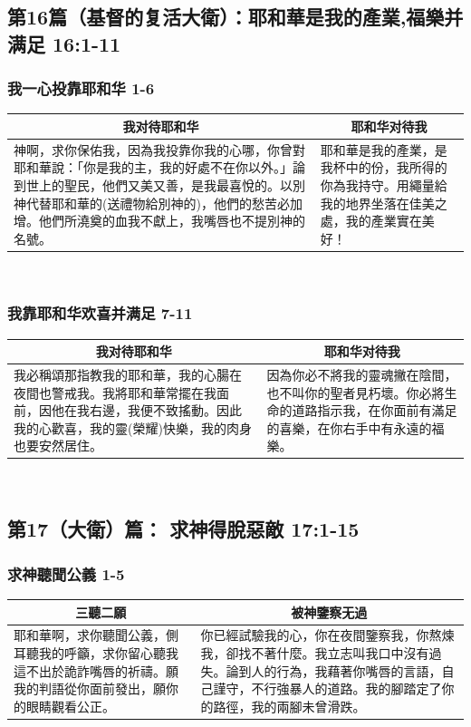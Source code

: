 \subsection{第16篇（基督的复活大衛）：耶和華是我的產業,福樂并满足  16:1-11}
\subsubsection{我一心投靠耶和华 1-6}
\begin{table}[H]
\centering
\begin{tabular}{p{}|p{}}\hline\hline
\multicolumn{1}{c|}{我对待耶和华}&\multicolumn{1}{c}{耶和华对待我}\\\hline
神啊，求你保佑我，因為我投靠你我的心哪，你曾對耶和華說：「你是我的主，我的好處不在你以外。」論到世上的聖民，他們又美又善，是我最喜悅的。以別神代替耶和華的(送禮物給別神的)，他們的愁苦必加增。他們所澆奠的血我不獻上，我嘴唇也不提別神的名號。
&耶和華是我的產業，是我杯中的份，我所得的你為我持守。用繩量給我的地界坐落在佳美之處，我的產業實在美好！\\\hline
\end{tabular}
\end{table} 
\subsubsection{我靠耶和华欢喜并满足 7-11}
\begin{table}[H]
\centering
\begin{tabular}{p{9.5cm}|p{7.24cm}}\hline\hline
\multicolumn{1}{c|}{我对待耶和华}&\multicolumn{1}{c}{耶和华对待我}\\\hline
我必稱頌那指教我的耶和華，我的心腸在夜間也警戒我。我將耶和華常擺在我面前，因他在我右邊，我便不致搖動。因此我的心歡喜，我的靈(榮耀)快樂，我的肉身也要安然居住。
&因為你必不將我的靈魂撇在陰間，也不叫你的聖者見朽壞。你必將生命的道路指示我，在你面前有滿足的喜樂，在你右手中有永遠的福樂。\\\hline
\end{tabular}
\end{table} 

\subsection{第17（大衛）篇： 求神得脫惡敵  17:1-15}
\subsubsection{求神聽聞公義 1-5}
\begin{table}[H]
\centering
\begin{tabular}{p{}|p{}}\hline\hline
\multicolumn{1}{c|}{三聽二願}&\multicolumn{1}{c}{被神鑒察无過}\\\hline
耶和華啊，求你聽聞公義，側耳聽我的呼籲，求你留心聽我這不出於詭詐嘴唇的祈禱。願我的判語從你面前發出，願你的眼睛觀看公正。
&你已經試驗我的心，你在夜間鑒察我，你熬煉我，卻找不著什麼。我立志叫我口中沒有過失。論到人的行為，我藉著你嘴唇的言語，自己謹守，不行強暴人的道路。我的腳踏定了你的路徑，我的兩腳未曾滑跌。\\\hline
\end{tabular}
\end{table} 
 
